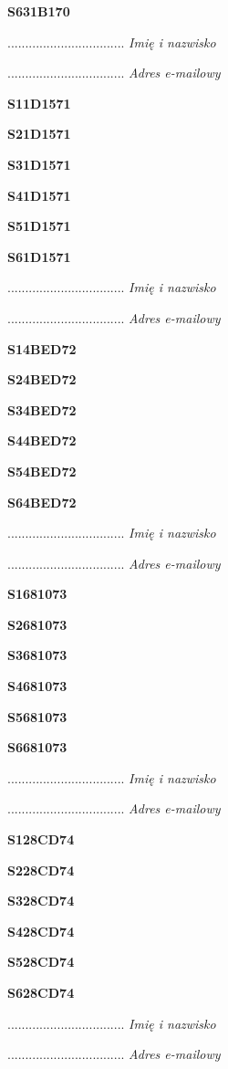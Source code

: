 \Large \textbf{S631B170}

.................................
\textit{Imię i nazwisko}

.................................
\textit{Adres e-mailowy}

\Large \textbf{S11D1571}

\Large \textbf{S21D1571}

\Large \textbf{S31D1571}

\Large \textbf{S41D1571}

\Large \textbf{S51D1571}

\Large \textbf{S61D1571}

.................................
\textit{Imię i nazwisko}

.................................
\textit{Adres e-mailowy}

\Large \textbf{S14BED72}

\Large \textbf{S24BED72}

\Large \textbf{S34BED72}

\Large \textbf{S44BED72}

\Large \textbf{S54BED72}

\Large \textbf{S64BED72}

.................................
\textit{Imię i nazwisko}

.................................
\textit{Adres e-mailowy}

\Large \textbf{S1681073}

\Large \textbf{S2681073}

\Large \textbf{S3681073}

\Large \textbf{S4681073}

\Large \textbf{S5681073}

\Large \textbf{S6681073}

.................................
\textit{Imię i nazwisko}

.................................
\textit{Adres e-mailowy}

\Large \textbf{S128CD74}

\Large \textbf{S228CD74}

\Large \textbf{S328CD74}

\Large \textbf{S428CD74}

\Large \textbf{S528CD74}

\Large \textbf{S628CD74}

.................................
\textit{Imię i nazwisko}

.................................
\textit{Adres e-mailowy}

